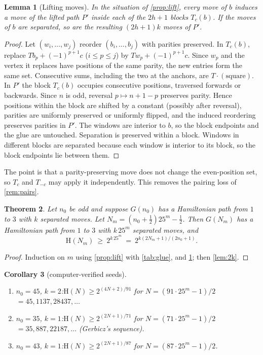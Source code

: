 \documentclass[11pt]{amsart}
\newtheorem{theorem}{Theorem}[section]
\newtheorem{lemma}[theorem]{Lemma}
\newtheorem{corollary}[theorem]{Corollary}
\theoremstyle{definition}
\newcommand{\Ham}{\mathrm{H}}
\begin{document}
\begin{lemma}[Lifting moves]\label{lem:liftmoves}
In the situation of \cref{prop:lift}, every move of $b$ induces a move of the lifted path
$P'$ inside each of the $2h+1$ blocks $T_c(b)$. If the moves of $b$ are separated,
so are the resulting $(2h+1)k$ moves of $P'$.
\end{lemma}
\begin{proof}
Let $(w_i,\dots,w_j)$ reorder $(b_i,\dots,b_j)$ with parities preserved. In $T_c(b)$,
replace $Tb_p+(-1)^{p+1}c$ ($i\le p\le j$) by $Tw_p+(-1)^{p+1}c$. Since $w_p$
and the vertex it replaces have positions of the same parity, the new entries form
the same set. Consecutive sums, including the two at the anchors, are
$T\cdot(\text{square})$. In $P'$ the block $T_c(b)$ occupies consecutive positions,
traversed forwards or backwards. Since $n$ is odd, reversal $p\mapsto n+1-p$
preserves parity. Hence positions within the block are shifted by a constant
(possibly after reversal), parities are uniformly preserved or uniformly flipped,
and the induced reordering preserves parities in $P'$. The windows are interior to
$b$, so the block endpoints and the glue are untouched. Separation is preserved
within a block. Windows in different blocks are separated because each window is
interior to its block, so the block endpoints lie between them.
\end{proof}

The point is that a parity-preserving move does not change the even-position set,
so $T_c$ and $T_{-c}$ may apply it independently. This removes the pairing loss of
\cref{rem:pairs}.

\begin{theorem}\label{thm:main}
Let $n_0$ be odd and suppose $G(n_0)$ has a Hamiltonian path from $1$ to $3$ with $k$
separated moves. Let $N_m=(n_0+\frac12)25^m-\frac12$. Then $G(N_m)$ has a
Hamiltonian path from $1$ to $3$ with $k\,25^m$ separated moves, and
\[
\Ham(N_m)\ \ge\ 2^{k\,25^m}\ =\ 2^{k(2N_m+1)/(2n_0+1)} .
\]
\end{theorem}
\begin{proof}
Induction on $m$ using \cref{prop:lift} with \cref{tab:glue}, and
\cref{lem:liftmoves}; then \cref{lem:2k}.
\end{proof}

\begin{corollary}[computer-verified seeds]\label{cor:seeds}
\begin{enumerate}
\item $n_0=45$, $k=2$:\quad $\Ham(N)\ge 2^{(4N+2)/91}$ for $N=(91\cdot25^m-1)/2$
$=45,1137,28437,\dots$
\item $n_0=35$, $k=1$:\quad $\Ham(N)\ge 2^{(2N+1)/71}$ for $N=(71\cdot25^m-1)/2$
$=35,887,22187,\dots$ (Gerbicz's sequence).
\item $n_0=43$, $k=1$:\quad $\Ham(N)\ge 2^{(2N+1)/87}$ for $N=(87\cdot25^m-1)/2$.
\end{enumerate}
\end{corollary}
\end{document}

